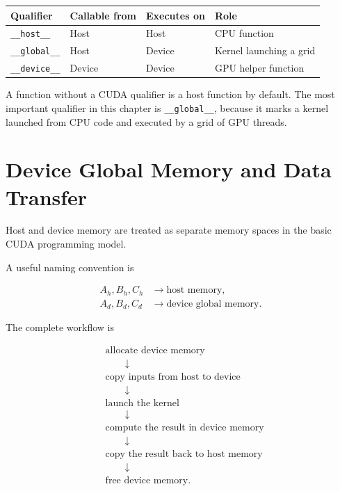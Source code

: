 \documentclass[11pt,a4paper]{article}
\begin{document}
\begin{center}
\begin{tabular}{llll}
\toprule
Qualifier & Callable from & Executes on & Role \\
\midrule
\texttt{\_\_host\_\_} & Host & Host & CPU function \\
\texttt{\_\_global\_\_} & Host & Device & Kernel launching a grid \\
\texttt{\_\_device\_\_} & Device & Device & GPU helper function \\
\bottomrule
\end{tabular}
\end{center}

A function without a CUDA qualifier is a host function by default. The most important qualifier in this chapter is \texttt{\_\_global\_\_}, because it marks a kernel launched from CPU code and executed by a grid of GPU threads.

\section{Device Global Memory and Data Transfer}

Host and device memory are treated as separate memory spaces in the basic CUDA programming model.

A useful naming convention is

\[
\begin{aligned}
A_h,B_h,C_h &\rightarrow \text{host memory},\\
A_d,B_d,C_d &\rightarrow \text{device global memory}.
\end{aligned}
\]

The complete workflow is

\[
\begin{aligned}
&\text{allocate device memory} \\
&\qquad\downarrow \\
&\text{copy inputs from host to device} \\
&\qquad\downarrow \\
&\text{launch the kernel} \\
&\qquad\downarrow \\
&\text{compute the result in device memory} \\
&\qquad\downarrow \\
&\text{copy the result back to host memory} \\
&\qquad\downarrow \\
&\text{free device memory}.
\end{aligned}
\]
\end{document}
